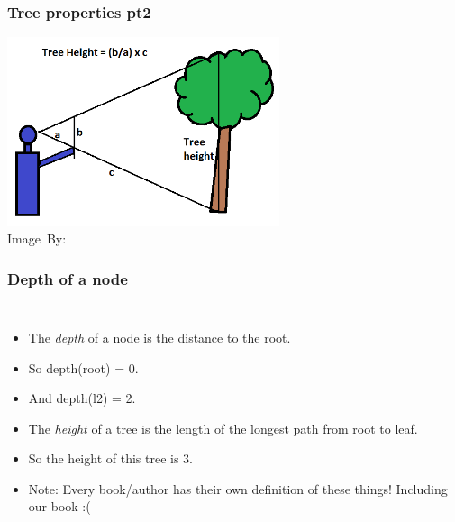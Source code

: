\begin{frame}
	\frametitle{Tree properties pt2}
	\begin{center}
		\includegraphics[width=0.6\textwidth]{images/stick.png}\\
		\hspace*{15pt}\hbox{\scriptsize Image By:}
	\end{center}
\end{frame}

\begin{frame}
	\frametitle{Depth of a node}

	\begin{columns}
		\begin{itemize}
			\item The \textit{depth} of a \alert<5->{node} is the distance to the root.
				\pause
			\item So depth(root) = 0.
			\item And depth(l2) = 2.
				\pause
			\item The \textit{height} of a \alert<5->{tree} is the length of the longest path from root to leaf.
				\pause
			\item So the height of this tree is 3.
				\pause
			\item Note: Every book/author has their own definition of these things! Including our book :(
		\end{itemize}
	\end{columns}
	
\end{frame}

